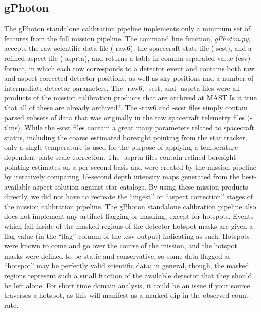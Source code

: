 \documentclass[preprint]{aastex}
\begin{document}
\subsection{gPhoton}
The gPhoton standalone calibration pipeline implements only a minimum set of features from the full mission pipeline. The command line function, \textit{gPhoton.py}, accepts the raw scientific data file (-raw6), the spacecraft state file (-scst), and a refined aspect file (-asprta), and returns a table in comma-separated-value (csv) format, in which each row corresponds to a detector event and contains both raw and aspect-corrected detector positions, as well as sky positions and a number of intermediate detector parameters. The -raw6, -scst, and -asprta files were all products of the mission calibration products that are archived at MAST {\color{red}Is it true that all of these are already archived?}. The -raw6 and -scst files simply contain parsed subsets of data that was originally in the raw spacecraft telemetry files (-tlms). While the -scst files contain a great many parameters related to spacecraft status, including the coarse estimated boresight pointing from the star tracker, only a single temperature is used for the purpose of applying a temperature dependent plate scale correction. The -asprta files contain refined boresight pointing estimates on a per-second basis and were created by the mission pipeline by iteratively comparing 15-second depth intensity maps generated from the best-available aspect solution against star catalogs. By using these mission products directly, we did not have to recreate the ``ingest'' or ``aspect correction'' stages of the mission calibration pipeline. The gPhoton standalone calibration pipeline also does not implement any artifact flagging or masking, except for hotspots. Events which fall inside of the masked regions of the detector hotspot masks are given a flag value (in the ``flag'' column of the .csv output) indicating as such. Hotspots were known to come and go over the course of the mission, and the hotspot masks were defined to be static and conservative, so some data flagged as ``hotspot'' may be perfectly valid scientific data; in general, though, the masked regions represent such a small fraction of the available detector that they should be left alone. For short time domain analysis, it could be an issue if your source traverses a hotspot, as this will manifest as a marked dip in the observed count rate.
\end{document}
